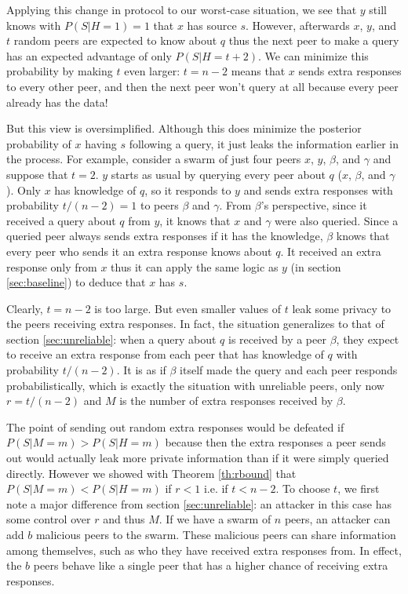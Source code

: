 \documentclass{article}
\newcommand{\secref}[1]{section \ref{sec:#1}}
\newcommand{\thref}[1]{Theorem \ref{th:#1}}
\begin{document}
Applying this change in protocol to our worst-case situation, we see that $y$
still knows with $P(S|H=1)=1$ that $x$ has source $s$. However, afterwards $x$,
$y$, and $t$ random peers are expected to know about $q$ thus the next peer
to make a query has an expected advantage of only $P(S|H=t+2)$. We can minimize this
probability by making $t$ even larger: $t=n-2$ means that $x$ sends extra
responses to every other peer, and then the next peer won't query at all because
every peer already has the data!

But this view is oversimplified. Although this does minimize the posterior
probability of $x$ having $s$ following a query, it just leaks the
information earlier in the process. For example, consider a swarm of just four
peers $x$, $y$, $\beta$, and $\gamma$ and suppose that $t=2$. $y$ starts as usual by
querying every peer about $q$ ($x$, $\beta$, and $\gamma$). Only $x$ has knowledge of
$q$, so it responds to $y$ and sends extra responses with probability
$t/(n-2)=1$ to peers $\beta$ and $\gamma$. From $\beta$'s perspective, since it received a
query about $q$ from $y$, it knows that $x$ and $\gamma$ were also queried. Since a
queried peer always sends extra responses if it has the knowledge, $\beta$ knows that
every peer who sends it an extra response knows about $q$. It received an extra
response only from $x$ thus it can apply the same logic as $y$ (in
\secref{baseline}) to deduce that $x$ has $s$.

Clearly, $t=n-2$ is too large. But even smaller values of $t$ leak some privacy to the
peers receiving extra responses. In fact, the situation generalizes to that of
\secref{unreliable}: when a query about $q$ is received by a peer $\beta$,
they expect to receive an extra response from each peer that has knowledge of
$q$ with probability $t/(n-2)$. It is as if $\beta$ itself made the query and each
peer responds probabilistically, which is exactly the situation with unreliable
peers, only now $r=t/(n-2)$ and $M$ is the number of extra responses received by
$\beta$.

The point of sending out random extra responses would be defeated if
$P(S|M=m)>P(S|H=m)$ because then the extra responses a peer sends out would
actually leak more private information than if it were simply queried directly.
However we showed with \thref{rbound} that $P(S|M=m)<P(S|H=m)$ if $r<1$ i.e. if
$t<n-2$.
To choose $t$, we first note
a major difference from \secref{unreliable}: an attacker in this case
has some control over $r$ and thus $M$. If we have a swarm of $n$ peers,
an attacker can add $b$ malicious peers to the swarm. These malicious peers can
share information among themselves, such as who they have received extra
responses from. In effect, the $b$ peers behave like a single peer that has a
higher chance of receiving extra responses.
\end{document}
